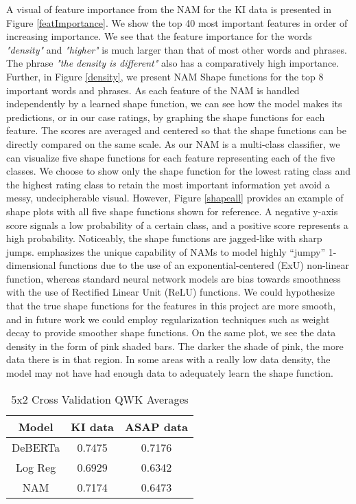 A visual of feature importance from the NAM for the KI data is presented in Figure \ref{featImportance}. We show the top 40 most important features in order of increasing importance. We see that the feature importance for the words \textit{"density"} and \textit{"higher"} is much larger than that of most other words and phrases. The phrase \textit{"the density is different"} also has a comparatively high importance. Further, in Figure \ref{density}, we present NAM Shape functions for the top 8 important words and phrases. As each feature of the NAM is handled independently by a learned shape function, we can see how the model makes its predictions, or in our case ratings, by graphing the shape functions for each feature. The scores are averaged and centered so that the shape functions can be directly compared on the same scale. As our NAM is a multi-class classifier, we can visualize five shape functions for each feature representing each of the five classes. We choose to show only the shape function for the lowest rating class and the highest rating class to retain the most important information yet avoid a messy, undecipherable visual. However, Figure \ref{shapeall} provides an example of shape plots with all five shape functions shown for reference. A negative y-axis score signals a low probability of a certain class, and a positive score represents a high probability. Noticeably, the shape functions are jagged-like with sharp jumps. \cite{agarwal2020neural} emphasizes the unique capability of NAMs to model highly “jumpy” 1-dimensional functions due to the use of an exponential-centered (ExU) non-linear function, whereas standard neural network models are bias towards smoothness with the use of Rectified Linear Unit (ReLU) functions. We could hypothesize that the true shape functions for the features in this project are more smooth, and in future work we could employ regularization techniques such as weight decay to provide smoother shape functions. On the same plot, we see the data density in the form of pink shaded bars. The darker the shade of pink, the more data there is in that region. In some areas with a really low data density, the model may not have had enough data to adequately learn the shape function.

\begin{table*}
\centering
  \caption{5x2 Cross Validation QWK Averages}
  \label{Avg}
  \begin{tabular}{ccc}
    \toprule
    Model & KI data & ASAP data \\
    \midrule
    DeBERTa & 0.7475 & 0.7176 \\
    Log Reg & 0.6929 & 0.6342 \\
    NAM & 0.7174 & 0.6473 \\
    \bottomrule
  \end{tabular}
\end{table*}

